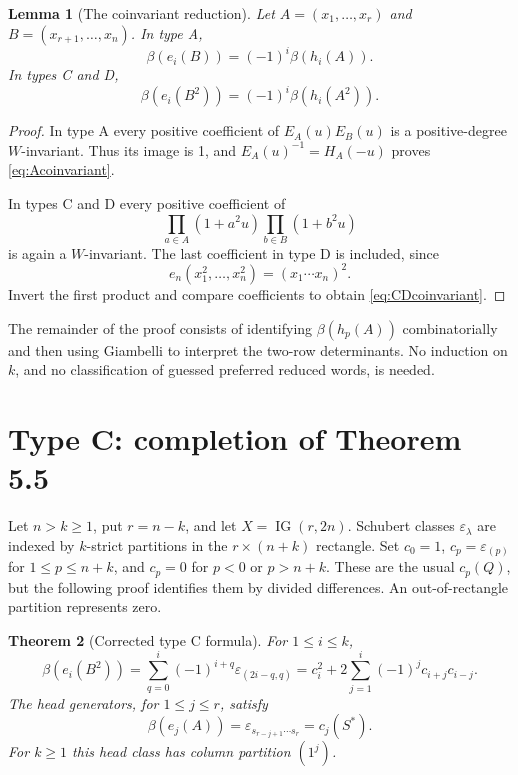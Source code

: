 \documentclass[11pt,letterpaper]{article}
\newtheorem{theorem}{Theorem}[section]
\newtheorem{lemma}[theorem]{Lemma}
\theoremstyle{remark}
\newcommand{\eps}{\varepsilon}
\newcommand{\IG}{\operatorname{IG}}
\begin{document}
\begin{lemma}[The coinvariant reduction]\label{lem:coinvariant}
Let $A=(x_1,\ldots,x_r)$ and $B=(x_{r+1},\ldots,x_n)$. In type A,
\begin{equation}
 \beta(e_i(B))=(-1)^i\beta(h_i(A)).\label{eq:Acoinvariant}
\end{equation}
In types C and D,
\begin{equation}
 \beta(e_i(B^2))=(-1)^i\beta(h_i(A^2)).\label{eq:CDcoinvariant}
\end{equation}
\end{lemma}
\begin{proof}
In type A every positive coefficient of $E_A(u)E_B(u)$ is a positive-degree $W$-invariant. Thus its image is 1, and $E_A(u)^{-1}=H_A(-u)$ proves \eqref{eq:Acoinvariant}.

In types C and D every positive coefficient of
\[
 \prod_{a\in A}(1+a^2u)\prod_{b\in B}(1+b^2u)
\]
is again a $W$-invariant. The last coefficient in type D is included, since
\[
 e_n(x_1^2,\ldots,x_n^2)=(x_1\cdots x_n)^2.
\]
Invert the first product and compare coefficients to obtain \eqref{eq:CDcoinvariant}.
\end{proof}

The remainder of the proof consists of identifying $\beta(h_p(A))$ combinatorially and then using Giambelli to interpret the two-row determinants. No induction on $k$, and no classification of guessed preferred reduced words, is needed.

\section{Type C: completion of Theorem 5.5}
\label{sec:C}

Let $n>k\geq1$, put $r=n-k$, and let $X=\IG(r,2n)$. Schubert classes $\eps_\lambda$ are indexed by $k$-strict partitions in the $r\times(n+k)$ rectangle. Set $c_0=1$, $c_p=\eps_{(p)}$ for $1\leq p\leq n+k$, and $c_p=0$ for $p<0$ or $p>n+k$. These are the usual $c_p(Q)$, but the following proof identifies them by divided differences. An out-of-rectangle partition represents zero.

\begin{theorem}[Corrected type C formula]\label{thm:C}
For $1\leq i\leq k$,
\begin{equation}
 \boxed{\displaystyle
 \beta(e_i(B^2))
 =\sum_{q=0}^{i}(-1)^{i+q}\eps_{(2i-q,q)}
 =c_i^2+2\sum_{j=1}^{i}(-1)^j c_{i+j}c_{i-j}.}
 \label{eq:Cmain}
\end{equation}
The head generators, for $1\leq j\leq r$, satisfy
\begin{equation}
 \beta(e_j(A))=\eps_{s_{r-j+1}\cdots s_r}=c_j(S^*).
 \label{eq:Chead}
\end{equation}
For $k\geq1$ this head class has column partition $(1^j)$.
\end{theorem}
\end{document}
